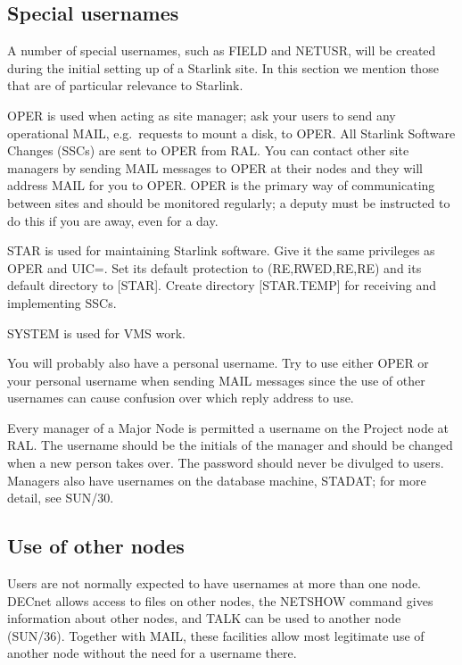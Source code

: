 \subsection {Special usernames}

A number of special usernames, such as FIELD and NETUSR, will be created during
the initial setting up of a Starlink site.
In this section we mention those that are of particular relevance to Starlink.

OPER is used when acting as site manager; ask your users to send any operational
MAIL, e.g.\ requests to mount a disk, to OPER.
All Starlink Software Changes (SSCs) are sent to OPER from RAL.
You can contact other site managers by sending MAIL messages to OPER at their
nodes and they will address MAIL for you to OPER.
OPER is the primary way of communicating between sites and should be monitored
regularly; a deputy must be instructed to do this if you are away, even for
a day.

STAR is used for maintaining Starlink software.
Give it the same privileges as OPER and UIC=.
Set its default protection to (RE,RWED,RE,RE) and its default directory to
[STAR].
Create directory [STAR.TEMP] for receiving and implementing SSCs.

SYSTEM is used for VMS work.

You will probably also have a personal username.
Try to use either OPER or your personal username when sending MAIL messages
since the use of other usernames can cause confusion over which reply address
to use.
 
Every manager of a Major Node is permitted a username on the Project node at
RAL.
The username should be the initials of the manager and should be changed when
a new person takes over.
The password should never be divulged to users.
Managers also have usernames on the database machine, STADAT; for more detail,
see SUN/30.

\subsection {Use of other nodes}

Users are not normally expected to have usernames at more than one node.
DECnet allows access to files on other nodes, the NETSHOW command gives
information about other nodes, and TALK can be used to another node (SUN/36).
Together with MAIL, these facilities allow most legitimate use of another node
without the need for a username there.
 
